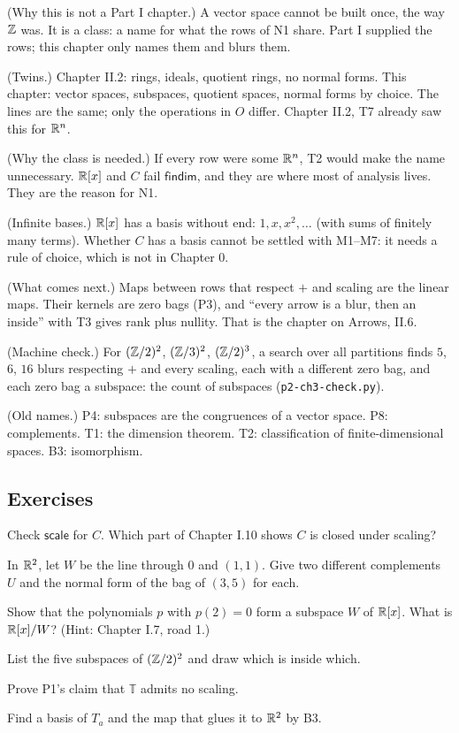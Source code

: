 \begin{lines}
\item[\lab{R1}] (Why this is not a Part I chapter.) A vector space cannot be built once, the way $\mathbb{Z}$ was. It is a class: a name for what the rows of N1 share. Part I supplied the rows; this chapter only names them and blurs them.
\item[\lab{R2}] (Twins.) Chapter II.2: rings, ideals, quotient rings, no normal forms. This chapter: vector spaces, subspaces, quotient spaces, normal forms by choice. The lines are the same; only the operations in $O$ differ. Chapter II.2, T7 already saw this for $\mathbb{R}^n$.
\item[\lab{R3}] (Why the class is needed.) If every row were some $\mathbb{R}^n$, T2 would make the name unnecessary. $\mathbb{R}[x]$ and $C$ fail $\mathsf{findim}$, and they are where most of analysis lives. They are the reason for N1.
\item[\lab{R4}] (Infinite bases.) $\mathbb{R}[x]$ has a basis without end: $1, x, x^2, \dots$ (with sums of finitely many terms). Whether $C$ has a basis cannot be settled with M1--M7: it needs a rule of choice, which is not in Chapter 0.
\item[\lab{R5}] (What comes next.) Maps between rows that respect $+$ and scaling are the linear maps. Their kernels are zero bags (P3), and ``every arrow is a blur, then an inside'' with T3 gives rank plus nullity. That is the chapter on Arrows, II.6.
\item[\lab{R6}] (Machine check.) For $(\mathbb{Z}/2)^2$, $(\mathbb{Z}/3)^2$, $(\mathbb{Z}/2)^3$, a search over all partitions finds $5$, $6$, $16$ blurs respecting $+$ and every scaling, each with a different zero bag, and each zero bag a subspace: the count of subspaces (\texttt{p2-ch3-check.py}).
\item[\lab{R7}] (Old names.) P4: subspaces are the congruences of a vector space. P8: complements. T1: the dimension theorem. T2: classification of finite-dimensional spaces. B3: isomorphism.
\end{lines}

\subsection*{Exercises}

\begin{lines}
\item[\lab{E1}] Check $\mathsf{scale}$ for $C$. Which part of Chapter I.10 shows $C$ is closed under scaling?
\item[\lab{E2}] In $\mathbb{R}^2$, let $W$ be the line through $0$ and $(1,1)$. Give two different complements $U$ and the normal form of the bag of $(3, 5)$ for each.
\item[\lab{E3}] Show that the polynomials $p$ with $p(2) = 0$ form a subspace $W$ of $\mathbb{R}[x]$. What is $\mathbb{R}[x]/W$? (Hint: Chapter I.7, road 1.)
\item[\lab{E4}] List the five subspaces of $(\mathbb{Z}/2)^2$ and draw which is inside which.
\item[\lab{E5}] Prove P1's claim that $\mathbb{T}$ admits no scaling.
\item[\lab{E6}] Find a basis of $T_a$ and the map that glues it to $\mathbb{R}^2$ by B3.
\end{lines}

